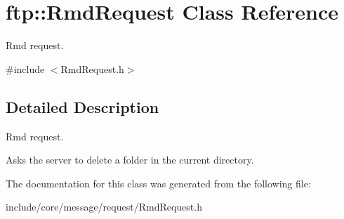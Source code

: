 \hypertarget{classftp_1_1_rmd_request}{\section{ftp\-:\-:Rmd\-Request Class Reference}
\label{classftp_1_1_rmd_request}
}


Rmd request.  




{\ttfamily \#include $<$Rmd\-Request.\-h$>$}



\subsection{Detailed Description}
Rmd request. 

Asks the server to delete a folder in the current directory. 

The documentation for this class was generated from the following file\-:\begin{DoxyCompactItemize}
\item 
include/core/message/request/Rmd\-Request.\-h\end{DoxyCompactItemize}
